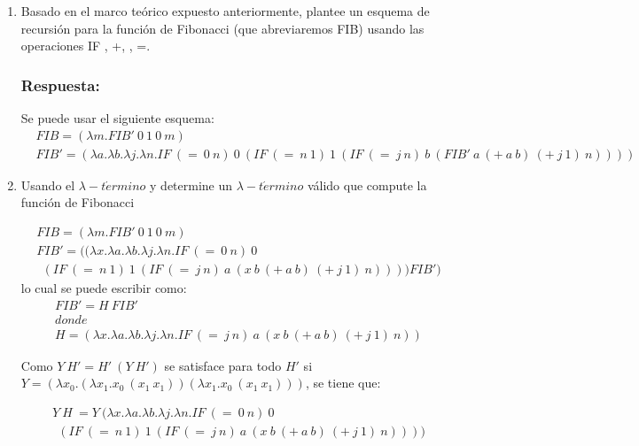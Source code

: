 \documentclass{article}
\begin{document}
\begin{enumerate}

\item Basado en el marco teórico expuesto anteriormente, plantee un esquema de recursión para la función de Fibonacci (que abreviaremos FIB) usando las operaciones IF , +, \textasteriskcentered, =.

\subsubsection*{Respuesta:}
Se puede usar el siguiente esquema:
\begin{align*}
&FIB=(\lambda m . FIB'\ 0\ 1\ 0\ m)
\\&FIB'=(\lambda a . \lambda b . \lambda j . \lambda n .IF\ (=\ 0\ n)\ 0\ (IF\ (=\ n\ 1)\ 1\ (IF\ (=\ j\ n)\ b\ (FIB'\ a\ (+\ a\ b)\ (+\ j\ 1)\ n))))
\end{align*}




\item Usando el $\lambda-t \acute ermino$ y determine un $\lambda-t \acute ermino$ válido que compute la función de Fibonacci

\begin{align*}
&FIB=(\lambda m . FIB'\ 0\ 1\ 0\ m)
\\&FIB'=((\lambda x . \lambda a . \lambda b . \lambda j . \lambda n .IF\ (=\ 0\ n)\ 0\ \\&\ \ (IF\ (=\ n\ 1)\ 1\ (IF\ (=\ j\ n)\ a\ (x\ b\ (+\ a\ b)\ (+\ j\ 1)\ n)))) FIB')
\end{align*}
lo cual se puede escribir como:
\begin{align*}
&FIB'=H\ FIB'
\\&donde
\\& H=(\lambda x . \lambda a . \lambda b . \lambda j . \lambda n . IF\ (=\ j\ n)\ a\ (x\ b\ (+\ a\ b)\ (+\ j\ 1)\ n))
\end{align*}

Como $Y\ H' = H'\ (Y\ H')$ se satisface para todo $H'$ si $Y=(\lambda x_0 . (\lambda x_1 . x_0\ (x_1\ x_1))(\lambda x_1 . x_0\ (x_1\ x_1)))$, se tiene que:

\begin{align*}
&Y\ H\ = Y\ (\lambda x . \lambda a . \lambda b . \lambda j . \lambda n .IF\ (=\ 0\ n)\ 0\ \\&\ \ (IF\ (=\ n\ 1)\ 1\ (IF\ (=\ j\ n)\ a\ (x\ b\ (+\ a\ b)\ (+\ j\ 1)\ n)))) 
\end{align*}


\end{enumerate}
\end{document}
